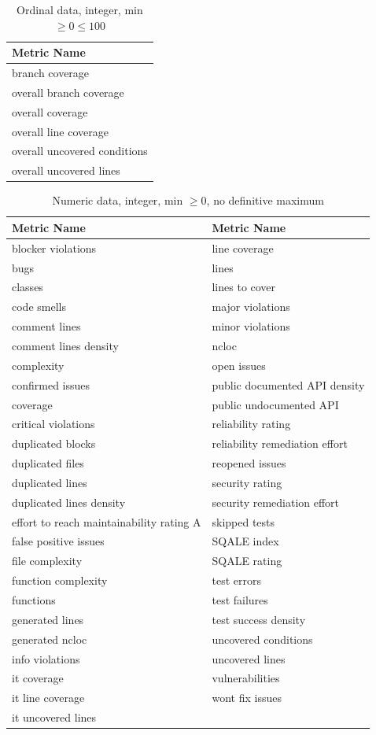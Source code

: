 \begin{table}[h!]
\caption{Ordinal data, integer, min $\geq{}0 \leq{}100$}
\label{tbl:available-data-above-0-max-100}
\begin{tabular}{@{}l@{}}
\toprule
Metric Name \\ \midrule
branch coverage \\
overall branch coverage \\
overall coverage \\
overall line coverage \\
overall uncovered conditions \\
overall uncovered lines \\ \bottomrule
\end{tabular}
\end{table}


\begin{table}[h!]
\caption{Numeric data, integer, min $\geq{}0$, no definitive maximum}
\label{tbl:available-data-above-0-no-max}
\begin{tabular}{@{}ll@{}}
\toprule
Metric Name & Metric Name \\ \midrule
blocker violations & line coverage \\
bugs & lines \\
classes & lines to cover \\
code smells & major violations \\
comment lines & minor violations \\
comment lines density & ncloc \\
complexity & open issues \\
confirmed issues & public documented API density \\
coverage & public undocumented API \\
critical violations & reliability rating \\
duplicated blocks & reliability remediation effort \\
duplicated files & reopened issues \\
duplicated lines & security rating \\
duplicated lines density & security remediation effort \\
effort to reach maintainability rating A & skipped tests \\
false positive issues & SQALE index \\
file complexity & SQALE rating \\
function complexity & test errors \\
functions & test failures \\
generated lines & test success density \\
generated ncloc & uncovered conditions \\
info violations & uncovered lines \\
it coverage & vulnerabilities \\
it line coverage & wont fix issues \\
it uncovered lines &  \\ \bottomrule
\end{tabular}
\end{table}


